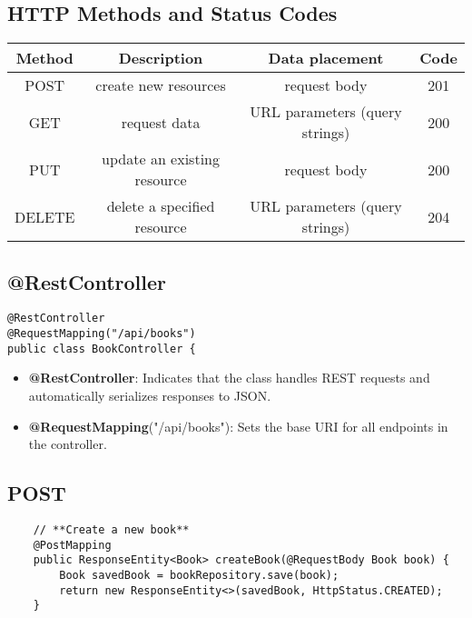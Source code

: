 \documentclass[a4paper, 12pt]{article}
\begin{document}
    \subsection{HTTP Methods and Status Codes}
    \begin{table}[h!]
        \centering
        \begin{tabular}{|c|c|c|c|}
            \hline
            Method & Description                 & Data placement                 & Code \\ \hline
            POST   & create new resources        & request body                   & 201  \\ \hline
            GET    & request data                & URL parameters (query strings) & 200  \\ \hline
            PUT    & update an existing resource & request body                   & 200  \\ \hline
            DELETE & delete a specified resource & URL parameters (query strings) & 204  \\ \hline
        \end{tabular}
        \label{tab:Annotation}
    \end{table}

    \subsection{@RestController}
    \begin{lstlisting}
@RestController
@RequestMapping("/api/books")
public class BookController {
    \end{lstlisting}
    \begin{itemize}
        \item \textbf{@RestController}: Indicates that the class handles REST requests and automatically serializes responses to JSON.
        \item \textbf{@RequestMapping}("/api/books"): Sets the base URI for all endpoints in the controller.
    \end{itemize}

    \subsection{POST}
    \begin{lstlisting}
    // **Create a new book**
    @PostMapping
    public ResponseEntity<Book> createBook(@RequestBody Book book) {
        Book savedBook = bookRepository.save(book);
        return new ResponseEntity<>(savedBook, HttpStatus.CREATED);
    }
    \end{lstlisting}
\end{document}
